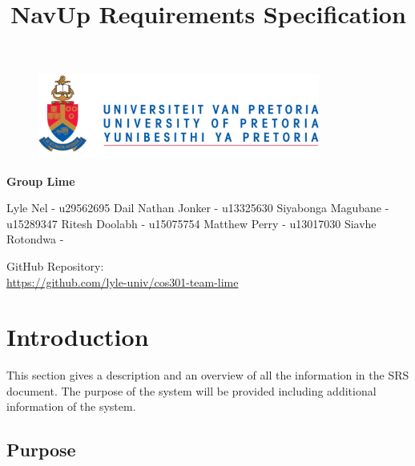 \documentclass{article}
\begin{document}
		\begin{figure}[t]
			\centering
			\includegraphics[width=350px]{UP_Logo.png}
		\end{figure}
				\title{NavUp Requirements Specification}
\maketitle
		\begin{center}
			\textbf{\newline Group Lime} \\
		\end{center}
			
				
		\begin{flushright} \large
			Lyle Nel -  u29562695 \newline
			Dail Nathan Jonker -  u13325630 \newline
			Siyabonga Magubane  - u15289347 \newline
			Ritesh Doolabh - u15075754 \newline
			Matthew Perry - u13017030 \newline
			Siavhe Rotondwa - \newline
		\end{flushright}
		
		
		
		
		GitHub Repository: \href{https://github.com/lyle-univ/cos301-team-lime}\\
		\url{https://github.com/lyle-univ/cos301-team-lime}
	

\clearpage
\tableofcontents

\clearpage
\section{Introduction}

This section gives a description and an overview of all the information in the SRS document. The purpose of the system will be provided including additional information of the system.

	\subsection{Purpose}
	
	
\end{document}
